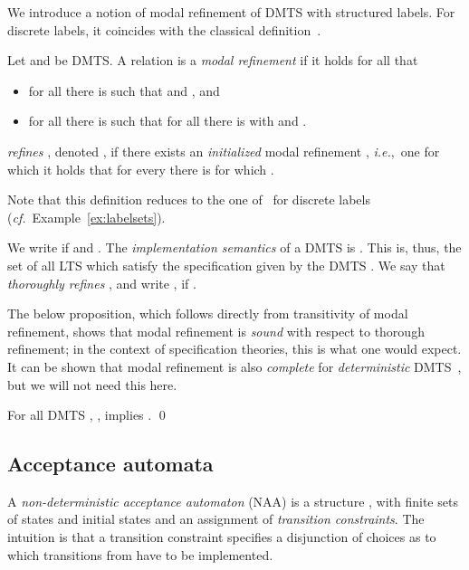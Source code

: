 \documentclass[twocolumn]{svjour3-dummy}
\newcommand*\ie{\textit{i.e.},}
\newcommand*\cf{\textit{cf.}\xspace}
\newcommand*\NAA{NAA\xspace}
\newcommand*\noproof{\qed}
\begin{document}
We introduce a notion of modal refinement of DMTS with structured
labels.  For discrete labels, it coincides with the classical
definition~\cite{DBLP:conf/lics/LarsenX90}.

\begin{definition}
  Let  and  be DMTS.  A relation  is
  a \emph{modal refinement} if it holds for all  that
  \begin{itemize}
  \item for all  there is 
    such that  and , and
  \item for all  there is  such that
    for all  there is  with
     and .
  \end{itemize}
   \emph{refines} , denoted , if there
  exists an \emph{initialized} modal refinement , \ie~one for which
  it holds that for every  there is  for
  which .
\end{definition}

Note that this definition reduces to the one
of~\cite{DBLP:conf/lics/LarsenX90, DBLP:conf/atva/BenesCK11} for
discrete labels (\cf~Example~\ref{ex:labelsets}).

We write  if  and .
The \emph{implementation semantics} of a DMTS  is .  This is, thus, the set of
all LTS which satisfy the specification given by the DMTS .  We say
that  \emph{thoroughly refines} , and write , if .

The below proposition, which follows directly from transitivity of modal
refinement, shows that modal refinement is \emph{sound} with respect to
thorough refinement; in the context of specification theories, this is
what one would expect.  It can be shown that modal refinement is also
\emph{complete} for \emph{deterministic}
DMTS~\cite{DBLP:journals/tcs/BenesKLS09}, but we will not need this
here.

\begin{proposition}\label{prop:mrtr}
  \label{pr:mrvstr}
  For all DMTS , ,  implies . \noproof
\end{proposition}

\subsection{Acceptance automata}

A \emph{non-deterministic acceptance automaton} (\NAA) is a structure
, with  finite sets of states and
initial states and  an assignment
of \emph{transition constraints}.
The intuition is that a transition constraint  specifies a disjunction of  choices  as to
which transitions from  have to be implemented.
\end{document}
